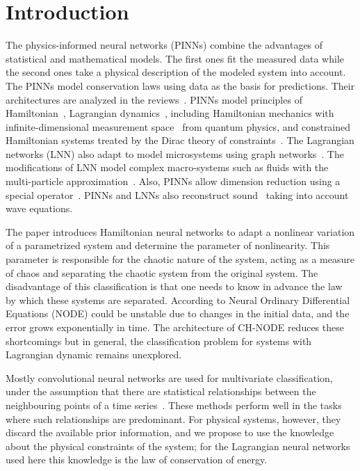 \documentclass[sn-mathphys-num]{sn-jnl}
\theoremstyle{thmstylethree}
\theoremstyle{thmstyletwo}
\theoremstyle{thmstyleone}
\begin{document}
\section{Introduction}

The physics-informed neural networks (PINNs) combine the advantages of statistical and mathematical models. The first ones fit the measured data while the second ones take a physical description of the modeled system into account. The PINNs model conservation laws using data as the basis for predictions. Their architectures are analyzed in the reviews~\cite{PINNreview,PINNsurvey}. PINNs model principles of Hamiltonian~\cite{HNN}, Lagrangian dynamics~\cite{article}, including Hamiltonian mechanics with infinite-dimensional measurement space~\cite{quantumHNN} from
quantum physics, and constrained Hamiltonian systems treated by the Dirac theory of constraints~\cite{HDNN}. The Lagrangian networks (LNN) also adapt to model microsystems using graph networks~\cite{LGNN}. The modifications of LNN model complex macro-systems such as fluids with the multi-particle approximation~\cite{fluid-LNN}. Also, PINNs allow dimension reduction using a special operator~\cite{HNNreduce}. PINNs and LNNs also reconstruct sound~\cite{PINNsoundwave} taking into account wave equations.

The paper \cite{HNNadapt} introduces Hamiltonian neural networks to adapt a nonlinear variation of a parametrized system and determine the parameter of nonlinearity. This parameter is responsible for the chaotic nature of the system, acting as a measure of chaos and separating the chaotic system from the original system. The disadvantage of this classification is that one needs to know in advance the law by which these systems are separated. According to \cite{HNNrobustclass} Neural Ordinary Differential Equations (NODE) could be unstable due to changes in the initial data, and the error grows exponentially in time. The architecture of CH-NODE reduces these shortcomings but in general, the classification problem for systems with Lagrangian dynamic remains unexplored.

Mostly convolutional neural networks are used for multivariate classification, under the assumption that there are statistical relationships between the neighbouring points of a time series~\cite{TCSreview}. These methods perform well in the tasks where such relationships are predominant. For physical systems, however, they discard the available prior information, and we propose to use the knowledge about the physical constraints of the system; for the Lagrangian neural networks used here this knowledge is the law of conservation of energy.
\end{document}
